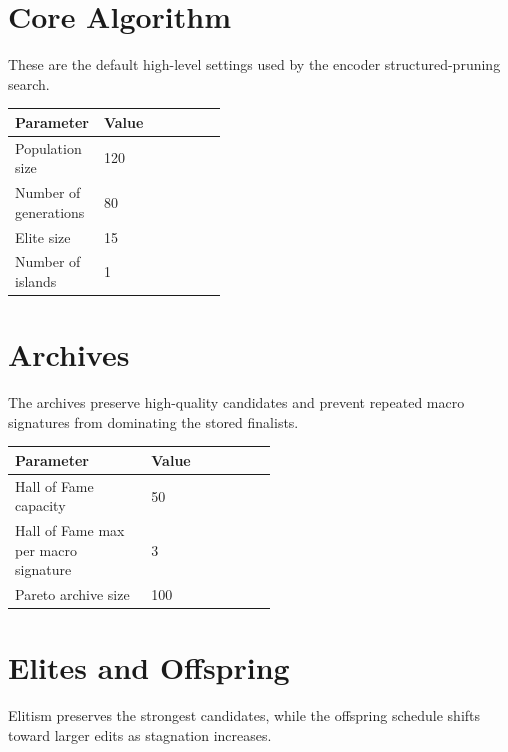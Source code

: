 \documentclass[10pt,twocolumn]{article}
\newenvironment{hptable}{%
  \begin{tcolorbox}[tablebox]
  \footnotesize
  \renewcommand{\arraystretch}{1.12}
  \setlength{\tabcolsep}{3.0pt}
}{%
  \end{tcolorbox}
}
\begin{document}
\appendix
{}

\section{Core Algorithm}
These are the default high-level settings used by the encoder structured-pruning search.

\begin{hptable}
\begin{tabularx}{\linewidth}{@{}W{0.42\linewidth}Y@{}}
\toprule
\textbf{Parameter} & \textbf{Value} \\
\midrule
Population size & 120 \\
Number of generations & 80 \\
Elite size & 15 \\
Number of islands & 1 \\
\bottomrule
\end{tabularx}
\end{hptable}

\section{Archives}
The archives preserve high-quality candidates and prevent repeated macro signatures from dominating the stored finalists.

\begin{hptable}
\begin{tabularx}{\linewidth}{@{}W{0.52\linewidth}Y@{}}
\toprule
\textbf{Parameter} & \textbf{Value} \\
\midrule
Hall of Fame capacity & 50 \\
Hall of Fame max per macro signature & 3 \\
Pareto archive size & 100 \\
\bottomrule
\end{tabularx}
\end{hptable}

\section{Elites and Offspring}
Elitism preserves the strongest candidates, while the offspring schedule shifts toward larger edits as stagnation increases.
\end{document}
